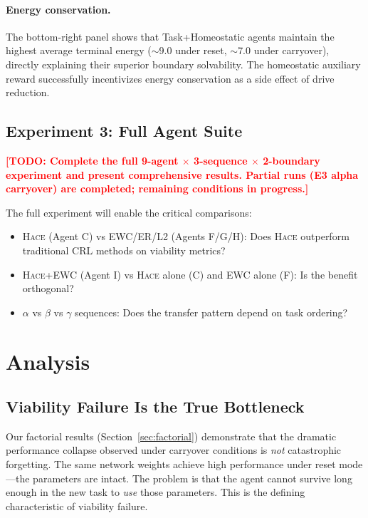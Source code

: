 \documentclass{article}
\newcommand{\todo}[1]{\textcolor{red}{\textbf{[TODO: #1]}}}
\newcommand{\hace}{\textsc{Hace}}
\begin{document}
\paragraph{Energy conservation.}
The bottom-right panel shows that Task+Homeostatic agents maintain the
highest average terminal energy ($\sim$9.0 under reset, $\sim$7.0 under
carryover), directly explaining their superior boundary solvability.
The homeostatic auxiliary reward successfully incentivizes energy
conservation as a side effect of drive reduction.

\subsection{Experiment 3: Full Agent Suite}
\label{sec:full_suite}

\todo{Complete the full 9-agent $\times$ 3-sequence $\times$ 2-boundary
experiment and present comprehensive results. Partial runs (E3 alpha
carryover) are completed; remaining conditions in progress.}

The full experiment will enable the critical comparisons:
\begin{itemize}[leftmargin=*,topsep=1pt,itemsep=1pt]
  \item \hace{} (Agent C) vs EWC/ER/L2 (Agents F/G/H): Does \hace{}
        outperform traditional CRL methods on viability metrics?
  \item \hace{}+EWC (Agent I) vs \hace{} alone (C) and EWC alone (F):
        Is the benefit orthogonal?
  \item $\alpha$ vs $\beta$ vs $\gamma$ sequences: Does the transfer
        pattern depend on task ordering?
\end{itemize}

\section{Analysis}
\label{sec:analysis}

\subsection{Viability Failure Is the True Bottleneck}

Our factorial results (Section~\ref{sec:factorial}) demonstrate that the
dramatic performance collapse observed under carryover conditions is
\emph{not} catastrophic forgetting. The same network weights achieve
high performance under reset mode—the parameters are intact. The problem
is that the agent cannot survive long enough in the new task to
\emph{use} those parameters. This is the defining characteristic of
viability failure.
\end{document}
